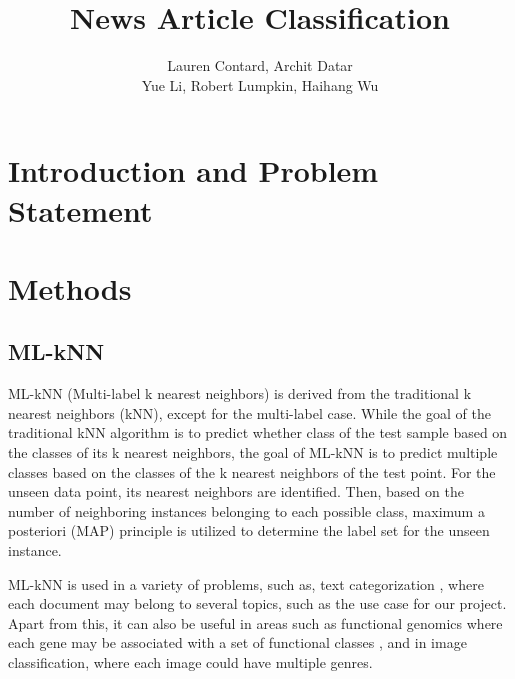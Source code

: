 \documentclass{article}
\title{\Huge News Article Classification}
\author{Lauren Contard, Archit Datar \\ 
Yue Li, Robert Lumpkin, Haihang Wu}
\date{}
\begin{document}
\begin{singlespace}
    \maketitle
\end{singlespace}


\section{Introduction and Problem Statement}

\section{Methods}

\subsection{ML-kNN}
ML-kNN (Multi-label k nearest neighbors) is derived from the traditional k nearest neighbors (kNN), except for the multi-label case. While the goal of the traditional kNN algorithm is to predict whether class of the test sample based on the classes of its k nearest neighbors, the goal of ML-kNN is to predict multiple classes based on the classes of the k nearest neighbors of the test point. For the unseen data point, its nearest neighbors are identified. Then, based on the number of neighboring instances belonging to each possible class, maximum a posteriori (MAP) principle is utilized to determine the label set for the unseen instance. 

ML-kNN is used in a variety of problems, such as, text categorization \autocite{McCallum99multi-labeltext}, where each document may belong to several topics, such as the use case for our project. Apart from this, it can also be useful in areas such as functional genomics where each gene may be associated with a set of functional classes \autocite{KernelMulti-labelClassification}, and in image classification, where each image could have multiple genres.\autocite{Boutell04learningmulti-label}  

\end{document}
